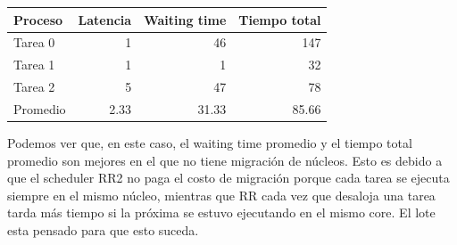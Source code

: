 \begin{tabular}{l | r | r | r }
  Proceso & Latencia & Waiting time & Tiempo total\\
  \hline
  Tarea 0 & 1 & 46 &  147\\
  Tarea 1 & 1 & 1 &  32\\
  Tarea 2 & 5 & 47 & 78 \\
  Promedio & 2.33 & 31.33 & 85.66 \\
\end{tabular}

Podemos ver que, en este caso, el waiting time promedio y el tiempo total promedio son mejores en el que no tiene migración de núcleos. Esto es debido a que el scheduler RR2
no paga el costo de migración porque cada tarea se ejecuta siempre en el mismo núcleo, mientras que RR cada vez que desaloja una tarea tarda más tiempo si la próxima se estuvo
ejecutando en el mismo core. El lote esta pensado para que esto suceda.
